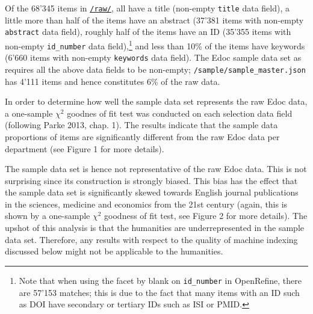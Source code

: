Of the 68'345 items in
\href{https://github.com/MHindermann/mas/tree/main/files/raw}{\texttt{/raw/}},
all have a title (non-empty \texttt{title} data field), a little more
than half of the items have an abstract (37'381 items with non-empty
\texttt{abstract} data field), roughly half of the items have an ID
(35'355 items with non-empty \texttt{id\_number} data field),\footnote{Note
  that when using the facet by blank on \texttt{id\_number} in
  OpenRefine, there are 57'153 matches; this is due to the fact that
  many items with an ID such as DOI have secondary or tertiary IDs such
  as ISI or PMID.} and less than 10\% of the items have keywords (6'660
items with non-empty \texttt{keywords} data field). The Edoc sample data
set as requires all the above data fields to be non-empty;
\texttt{/sample/sample\_master.json} has 4'111 items and hence
constitutes 6\% of the raw data.

In order to determine how well the sample data set represents the raw
Edoc data, a one-sample \(\chi^2\) goodnes of fit test was conducted on
each selection data field (following Parke 2013, chap. 1). The results
indicate that the sample data proportions of items are significantly
different from the raw Edoc data per department (see Figure 1 for more
details).

The sample data set is hence not representative of the raw Edoc data.
This is not surprising since its construction is strongly biased. This
bias has the effect that the sample data set is significantly skewed
towards English journal publications in the sciences, medicine and
economics from the 21st century (again, this is shown by a one-sample
\(\chi^2\) goodness of fit test, see Figure 2 for more details). The
upshot of this analysis is that the humanities are underrepresented in
the sample data set. Therefore, any results with respect to the quality
of machine indexing discussed below might not be applicable to the
humanities.

